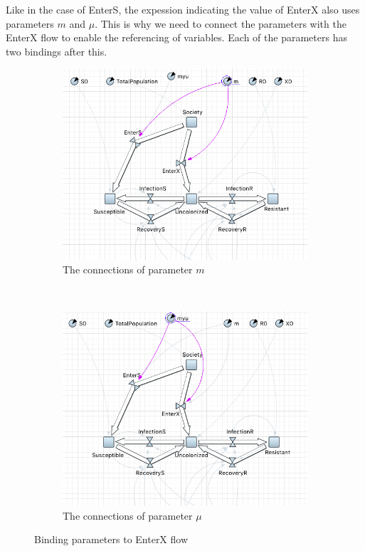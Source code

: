 Like in the case of EnterS, the expession indicating the value of EnterX also uses parameters $m$ and $\mu$. This is why we need to connect the parameters with the EnterX flow to enable the referencing of variables. Each of the parameters has two bindings after this.

\begin{figure}[H]
    \centering
    \begin{subfigure}[b]{0.48\textwidth}
        \includegraphics[width=\textwidth]{img/screens/society/society10}
        \caption{The connections of parameter $m$}
    \end{subfigure}
    ~ %
    \begin{subfigure}[b]{0.48\textwidth}
        \includegraphics[width=\textwidth]{img/screens/society/society11}
        \caption{The connections of parameter $\mu$}
    \end{subfigure}
    \caption{Binding parameters to EnterX flow}
\end{figure}
